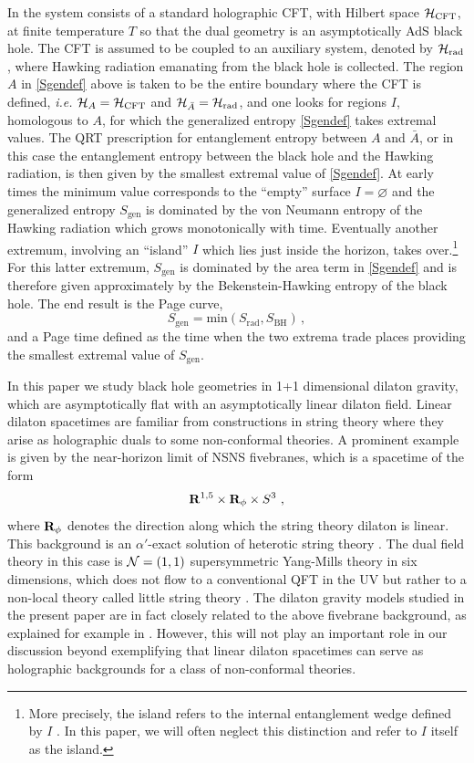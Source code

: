 \documentclass[12pt,a4paper]{article}
\newcommand{\be}{\begin{equation}}
\newcommand{\ee}{\end{equation}}
\begin{document}
In \cite{Penington:2019npb} the system consists of a standard holographic CFT, with Hilbert space ${\cal H}_\text{CFT}$, at finite temperature $T$ so that the dual geometry is an asymptotically AdS black hole. The CFT is assumed to be coupled to an auxiliary system, denoted by ${\cal H}_\text{rad}$, where Hawking radiation emanating from the black hole is collected. The region $A$ in \eqref{Sgendef} above is taken to be the entire boundary where the CFT is defined, {\it i.e.} ${\cal H}_A={\cal H}_\text{CFT}$ and ${\cal H}_{\bar A} = {\cal H}_\text{rad}$, and one looks for regions $I$, homologous to $A$, for which the generalized entropy \eqref{Sgendef} takes extremal values. The QRT prescription for entanglement entropy between $A$ and ${\bar A}$, or in this case the entanglement entropy between the black hole and the Hawking radiation, is then given by the smallest extremal value of \eqref{Sgendef}. At early times the minimum value corresponds to the ``empty'' surface $I=\varnothing$ and the generalized entropy $S_\text{gen}$ is dominated by the von Neumann entropy of the Hawking radiation which grows monotonically with time. Eventually another extremum, involving  an ``island'' $I$ which lies just inside the horizon, takes over.\footnote{More precisely, the island refers to the internal entanglement wedge defined by $I$ \cite{Almheiri:2019hni}. In this paper, we will often neglect this distinction and refer to $I$ itself as the island.} For this latter extremum, $S_\text{gen}$ is dominated by the area term in \eqref{Sgendef} and is therefore given approximately by the Bekenstein-Hawking  entropy of the black hole. The end result is the Page curve,
\be
S_\text{gen} = \text{min}( S_\text{rad}, S_\text{BH})\,,
\ee
and a Page time defined as the time when the two extrema trade places providing the smallest extremal value of $S_\text{gen}$.

In this paper we study black hole geometries in 1+1 dimensional dilaton gravity, which are asymptotically flat with an asymptotically linear dilaton field.  Linear dilaton spacetimes are familiar from constructions in string theory where they arise as holographic duals to some non-conformal theories. A prominent example is given by the near-horizon limit of NSNS fivebranes, which is a spacetime of the form
\be
{\bf R}^{1,5}\times {\bf R}_\phi \times S^3~,
\ee
where ${\bf R}_\phi$ denotes the direction along which the string theory dilaton is linear. This background is an $\alpha'$-exact solution of heterotic string theory \cite{Callan:1991at}. The dual field theory in this case is ${\cal N}=(1,1)$ supersymmetric Yang-Mills theory in six dimensions, which does not flow to a conventional QFT in the UV but rather to a non-local theory called little string theory \cite{Aharony:1998ub}. The dilaton gravity models studied in the present paper are in fact closely related to the above fivebrane background, as explained for example in \cite{Maldacena:1997cg}.  However, this will not play an important role in our discussion beyond exemplifying that linear dilaton spacetimes can serve as holographic backgrounds for a class of non-conformal theories. 
\end{document}
